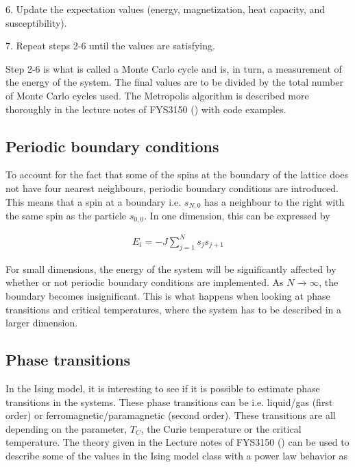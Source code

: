 \documentclass[12pt,english,a4paper]{article}
\begin{document}
6. Update the expectation values (energy, magnetization, heat capacity, and susceptibility).

7. Repeat steps 2-6 until the values are satisfying.


\noindent Step 2-6 is what is called a Monte Carlo cycle and is, in turn, a measurement of the energy of the system. The final values are to be divided by the total number of Monte Carlo cycles used. The Metropolis algorithm is described more thoroughly in the lecture notes of FYS3150 (\cite{LectureIsing}) with code examples.

\subsection{Periodic boundary conditions}
To account for the fact that some of the spins at the boundary of the lattice does not have four nearest neighbours, periodic boundary conditions are introduced. This means that a spin at a boundary i.e. $s_{N,0}$ has a neighbour to the right with the same spin as the particle $s_{0,0}$. In one dimension, this can be expressed by

\begin{align*}
    E_i=-J\sum_{j=1}^{N}s_js_{j+1}
\end{align*}

For small dimensions, the energy of the system will be significantly affected by whether or not periodic boundary conditions are implemented. As $N \rightarrow \infty$, the boundary becomes insignificant. This is what happens when looking at phase transitions and critical temperatures, where the system has to be described in a larger dimension.

\subsection{Phase transitions}
In the Ising model, it is interesting to see if it is possible to estimate phase transitions in the systems. These phase transitions can be i.e. liquid/gas (first order) or ferromagnetic/paramagnetic (second order). These transitions are all depending on the parameter, $T_C$, the Curie temperature or the critical temperature. The theory given in the Lecture notes of FYS3150 (\cite{LectureIsing}) can be used to describe some of the values in the Ising model class with a power law behavior as
\end{document}
